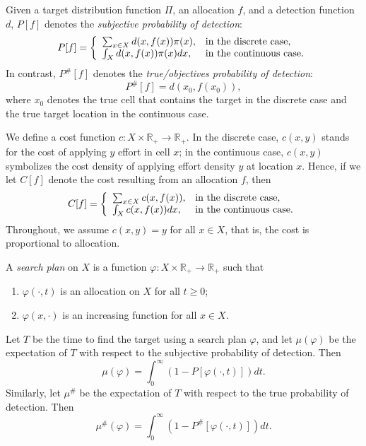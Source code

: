 \documentclass[12pt]{article}
\theoremstyle{plain}
\theoremstyle{definition}
\theoremstyle{remark}
\begin{document}
Given a target distribution function $\Pi$,  an allocation $f$, and a detection function $d$,  $P[f]$ denotes the \emph{subjective probability of detection}:
\begin{equation}
\label{eq:subjectiveprob}
P[f]=\left\{
		                           \begin{array}{ll}
		                           \sum_{x\in X}d(x, f(x))\pi(x),& \hbox{in the discrete case,} \\
					\int_Xd(x, f(x))\pi(x)dx, & \hbox{in the continuous case.} 
		                          \end{array}
		                         \right.
\end{equation}
In contrast,  $P^{\#} [f]$ denotes the \emph{true/objectives probability of detection}: 
\begin{equation}
\label{eq:trueprob}
P^{\#}[f]=d(x_0, f(x_0)),
\end{equation}
where $x_0$ denotes the true cell that contains the target in the discrete case and the true target location in the continuous case. 

We define a cost function $c: X \times \mathbb{R}_+ \rightarrow \mathbb{R}_+$.  In the discrete case,  $c(x,  y)$ stands for the cost of applying $y$ effort in cell $x$; in the continuous case, $c(x, y)$ symbolizes the cost density of applying effort density $y$ at location $x$.  Hence,  if we let $C[f]$ denote the cost resulting from an allocation $f$,  then
\[
C[f]=\left\{
		                           \begin{array}{ll}
		                           \sum_{x\in X} c(x, f(x)),& \hbox{in the discrete case,} \\
					\int_Xc(x, f(x))dx, & \hbox{in the continuous case.} 
		                          \end{array}
		                         \right.
\]
Throughout, we assume $c(x, y)=y$ for all $x\in X$, that is,  the cost is proportional to allocation.

A \emph{search plan} on $X$ is a function $\varphi: X\times \mathbb{R}_+\rightarrow \mathbb{R}_+$ such that
\begin{enumerate}
\item[(i)]$\varphi(\cdot, t)$ is an allocation on $X$ for all $t\geq 0$;
\item[(ii)]$\varphi(x, \cdot)$ is an increasing function for all $x\in X$.
\end{enumerate}
Let $T$ be the time to find the target using a search plan $\varphi$, and let $\mu(\varphi)$ be the expectation of $T$ with respect to the subjective probability of detection.  Then 
\begin{equation*}
\mu(\varphi)=\int_0^\infty  (1-P[\varphi(\cdot, t)])dt.
\end{equation*}
Similarly,  let $\mu^{\#}$ be the expectation of $T$ with respect to the true probability of detection.  Then
\begin{equation}
\label{eq:truemean}
\mu^{\#} (\varphi)=\int_0^\infty(1-P^{\#}[\varphi(\cdot, t)])dt.
\end{equation}
\end{document}
